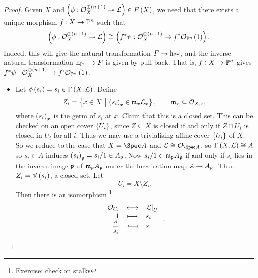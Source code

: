 \begin{proof}
Given $ X $ and $ \br{\phi : \OOO_X^{\oplus \br{n + 1}} \twoheadrightarrow \LLL} \in F\br{X} $, we need that there exists a unique morphism $ f : X \to \mathbb{P}^n $ such that
$$ \br{\phi : \OOO_X^{\oplus \br{n + 1}} \twoheadrightarrow \LLL} \cong \br{f^*\psi : \OOO_X^{\oplus \br{n + 1}} \to f^*\OOO_{\PP^n}\br{1}}. $$
Indeed, this will give the natural transformation $ F \to \mathrm{h}_{\mathbb{P}^n} $, and the inverse natural transformation $ \mathrm{h}_{\mathbb{P}^n} \to F $ is given by pull-back. That is, $ f : X \to \mathbb{P}^n $ gives $ f^*\psi : \OOO_X^{\oplus \br{n + 1}} \to f^*\OOO_{\PP^n}\br{1} $.
\begin{itemize}
\item Let $ \phi\br{e_i} = s_i \in \Gamma\br{X, \LLL} $. Define
$$ Z_i = \cbr{x \in X \st \br{s_i}_x \in \mmm_x\LLL_x}, \qquad \mmm_x \subseteq \OOO_{X, x}, $$
where $ \br{s_i}_x $ is the germ of $ s_i $ at $ x $. Claim that this is a closed set. This can be checked on an open cover $ \cbr{U_i} $, since $ Z \subseteq X $ is closed if and only if $ Z \cap U_i $ is closed in $ U_i $ for all $ i $. Thus we may use a trivialising affine cover $ \cbr{U_i} $ of $ X $. So we reduce to the case that $ X = \Spec A $ and $ \LLL \cong \OOO_{\Spec A} $, so $ \Gamma\br{X, \LLL} \cong A $ so $ s_i \in A $ induces $ \br{s_i}_\ppp = s_i / 1 \in A_\ppp $. Now $ s_i / 1 \in \mathfrak{m}_{\mathfrak{p}} A_{\mathfrak{p}} $ if and only if $ s_i $ lies in the inverse image $ \mathfrak{p} $ of $ \mathfrak{m}_{\mathfrak{p}} A_{\mathfrak{p}} $ under the localisation map $ A \to A_{\mathfrak{p}} $. Thus $ Z_i = \VV\br{s_i} $, a closed set. Let
$$ U_i = X \setminus Z_i. $$
Then there is an isomorphism \footnote{Exercise: check on stalks}
$$ \bijection{\OOO_{U_i}}{\eval{\LLL}_{U_i}}{1}{s_i}{\dfrac{s}{s_i}}{s}. $$



\end{itemize}
\end{proof}
